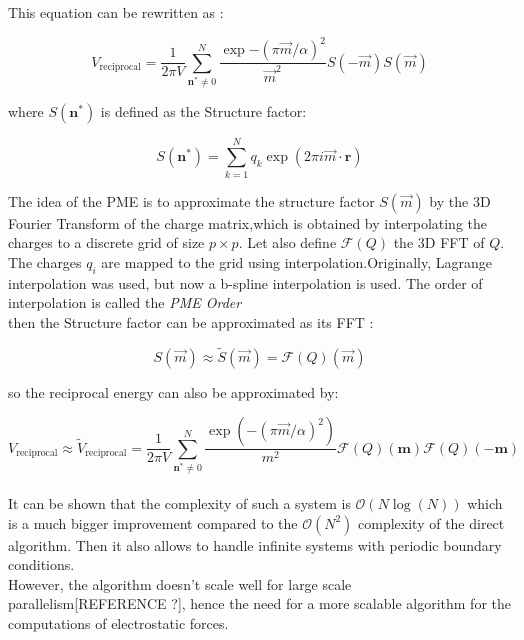 \documentclass[12pt,twoside,a4paper]{report}
\begin{document}
This equation can be rewritten as :

\begin{equation*}
    V_{\text{reciprocal}} =\frac{1}{2 \pi V} \sum\limits_{\textbf{n}^* \neq 0}^{N}  \frac{\exp{-(\pi \overrightarrow{m}/\alpha)^2}}{\overrightarrow{m}^2}S(-\overrightarrow{m} )S(\overrightarrow{m} )
\end{equation*}

where $S(\textbf{n}^* )$ is defined as the Structure factor:

\begin{equation}
    S(\textbf{n}^* ) = \sum\limits_{k=1}^{N} {q_k \exp(2 \pi i \vec{m} \cdot \textbf{r}) }
\end{equation}


The idea of the PME is to approximate the structure factor $S(\vec{m})$ by the 3D Fourier Transform of the charge matrix,which is obtained by interpolating the charges to a discrete grid of size $ p \times p $. 
	Let also define $\mathcal{F}(Q)$ the 3D FFT of $Q$. The charges $q_i$ are mapped to the grid using interpolation.Originally, Lagrange interpolation was used, but now a b-spline interpolation is used. The order of interpolation is called the \textit{PME Order}\\

then the Structure factor can be approximated as its FFT :

\begin{equation}
   S(\overrightarrow{m}) \approx \widetilde{S}(\overrightarrow{m}) = \mathcal{F}(Q)(\overrightarrow{m})
\end{equation}

so the reciprocal energy can also be approximated by:

\begin{equation}
   V_{\text{reciprocal}} \approx \widetilde{V}_{\text{reciprocal}}   =\frac{1}{2 \pi V} \sum\limits_{\textbf{n}^* \neq 0}^{N}  \frac{\exp{(-(\pi \overrightarrow{m}/\alpha)^2)}}{m^2}\mathcal{F}(Q)(\textbf{m})\mathcal{F}(Q)(-\textbf{m})
\end{equation} \\

It can be shown that the complexity of such a system is $\mathcal{O}(N \log(N))$ which is a much bigger improvement compared to the $\mathcal{O}(N^2)$ complexity of the direct algorithm. Then it also allows to handle infinite systems with periodic boundary conditions.\\ However, the algorithm doesn't scale well for large scale parallelism[REFERENCE ?], hence the need for a more scalable algorithm for the computations of electrostatic forces.
\end{document}

